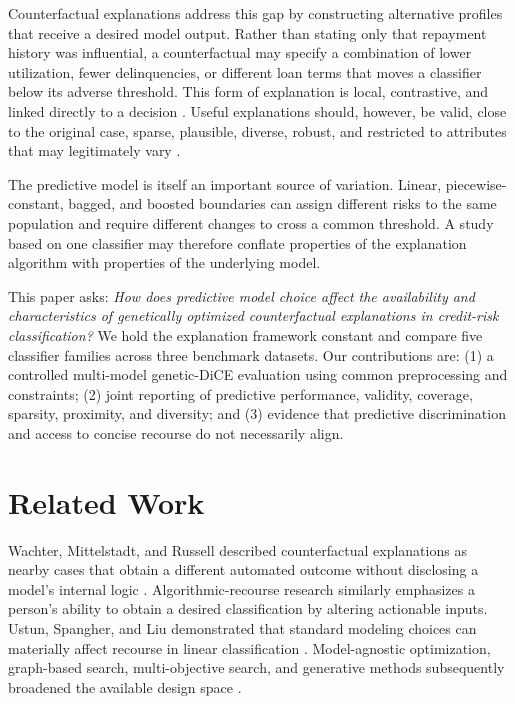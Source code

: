 \documentclass[conference]{IEEEtran}
\begin{document}
Counterfactual explanations address this gap by constructing alternative profiles that receive a desired model output. Rather than stating only that repayment history was influential, a counterfactual may specify a combination of lower utilization, fewer delinquencies, or different loan terms that moves a classifier below its adverse threshold. This form of explanation is local, contrastive, and linked directly to a decision \cite{wachter2018counterfactual,ustun2019recourse}. Useful explanations should, however, be valid, close to the original case, sparse, plausible, diverse, robust, and restricted to attributes that may legitimately vary \cite{mothilal2020dice,verma2020review,keane2021deficits,jiang2024robust}.

The predictive model is itself an important source of variation. Linear, piecewise-constant, bagged, and boosted boundaries can assign different risks to the same population and require different changes to cross a common threshold. A study based on one classifier may therefore conflate properties of the explanation algorithm with properties of the underlying model.

This paper asks: \emph{How does predictive model choice affect the availability and characteristics of genetically optimized counterfactual explanations in credit-risk classification?} We hold the explanation framework constant and compare five classifier families across three benchmark datasets. Our contributions are: (1) a controlled multi-model genetic-DiCE evaluation using common preprocessing and constraints; (2) joint reporting of predictive performance, validity, coverage, sparsity, proximity, and diversity; and (3) evidence that predictive discrimination and access to concise recourse do not necessarily align.

\section{Related Work}
Wachter, Mittelstadt, and Russell described counterfactual explanations as nearby cases that obtain a different automated outcome without disclosing a model's internal logic \cite{wachter2018counterfactual}. Algorithmic-recourse research similarly emphasizes a person's ability to obtain a desired classification by altering actionable inputs. Ustun, Spangher, and Liu demonstrated that standard modeling choices can materially affect recourse in linear classification \cite{ustun2019recourse}. Model-agnostic optimization, graph-based search, multi-objective search, and generative methods subsequently broadened the available design space \cite{karimi2020mace,poyiadzi2020face,russell2019efficient,dandl2020multi,nemirovsky2022countergan}.
\end{document}
